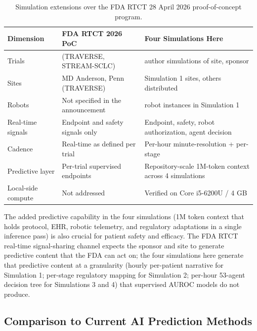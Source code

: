 \begin{table}[H]
\centering
\caption{Simulation extensions over the FDA RTCT 28 April 2026
proof-of-concept program.}
\label{tab:disc-fda-extension}
{\renewcommand{\arraystretch}{1.15}
\begin{tabular}{>{\raggedright\arraybackslash}p{3.25cm} >{\raggedright\arraybackslash}p{5.75cm} >{\raggedright\arraybackslash}p{6.3cm}}
\toprule
\textbf{Dimension} & \textbf{FDA RTCT 2026 PoC} & \textbf{Four Simulations Here} \\
\midrule
Trials                 & 2 (TRAVERSE, STREAM-SCLC)                & 4 author simulations of site, sponsor       \\
Sites                  & MD Anderson, Penn (TRAVERSE)             & 4 Simulation 1 sites, others distributed       \\
Robots                 & Not specified in the announcement         & 116 robot instances in Simulation 1                   \\
Real-time signals      & Endpoint and safety signals only         & Endpoint, safety, robot authorization, agent decision \\
Cadence                & Real-time as defined per trial            & Per-hour minute-resolution + per-stage       \\
Predictive layer       & Per-trial supervised endpoints            & Repository-scale 1M-token context across 4 simulations\\
Local-side compute     & Not addressed                            & Verified on Core i5-6200U / 4 GB     \\
\bottomrule
\end{tabular}}
\end{table}

The added predictive capability in the four simulations (1M token
context that holds protocol, EHR, robotic telemetry, and regulatory
adaptations in a single inference pass) is also crucial for patient
safety and efficacy. The FDA RTCT real-time signal-sharing channel
expects the sponsor and site to generate predictive content that the
FDA can act on; the four simulations here generate that predictive
content at a granularity (hourly per-patient narrative for Simulation
1; per-stage regulatory mapping for Simulation 2; per-hour 53-agent
decision tree for Simulations 3 and 4) that supervised AUROC models
do not produce.

\subsection{Comparison to Current AI Prediction Methods}
\label{sec:disc-ai-baseline}

